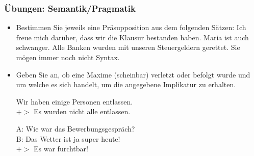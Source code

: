 \begin{frame}
\frametitle{Übungen: Semantik/Pragmatik}

\begin{itemize}
	
	\item Bestimmen Sie jeweils eine Präsupposition aus dem folgenden Sätzen:
	\eal
	\ex Ich freue mich darüber, dass wir die Klausur bestanden haben.
	\ex Maria ist auch schwanger.
	\ex Alle Banken wurden mit unseren Steuergeldern gerettet.
	\ex Sie mögen immer noch nicht Syntax.
	\zl

	\item Geben Sie an, ob eine Maxime (scheinbar) verletzt oder befolgt wurde und um welche es sich handelt, um die angegebene Implikatur zu erhalten.
	
	\ea Wir haben einige Personen entlassen.\\
	$+>$ Es wurden nicht alle entlassen.
	\z
	
	\ea A: Wie war das Bewerbungsgespräch?\\
	B: Das Wetter ist ja super heute!\\
	$+>$ Es war furchtbar!
	\z
		
\end{itemize}

\end{frame}
